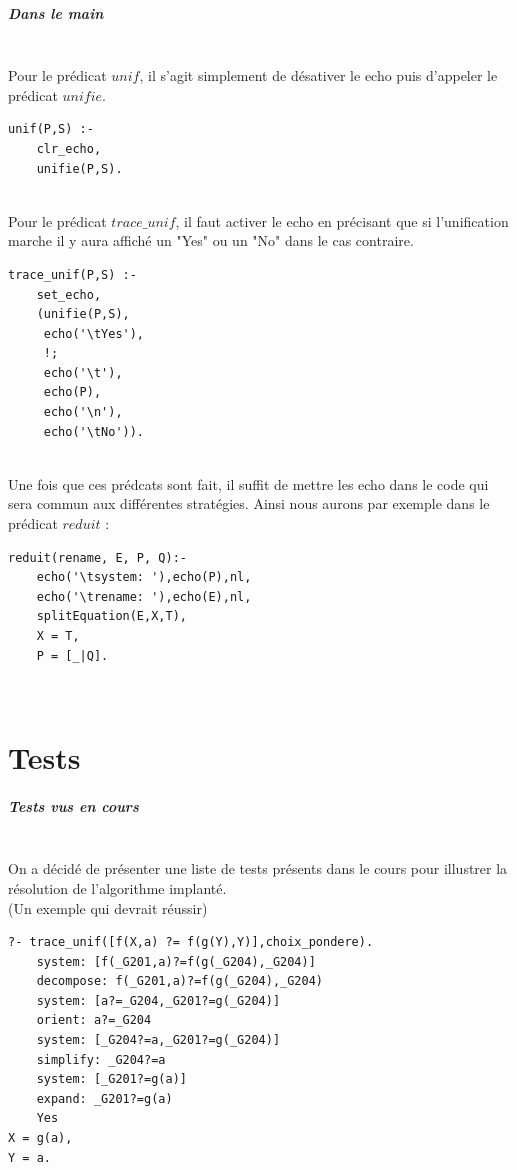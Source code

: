 \documentclass[10pt,a4paper]{report}
\begin{document}
\paragraph{Dans le main} ~\\
Pour le prédicat $unif$, il s'agit simplement de désativer le echo puis d'appeler le prédicat $unifie$.
\begin{lstlisting}[caption ={unif dans $main.pl$}]
unif(P,S) :-
	clr_echo,
	unifie(P,S).
\end{lstlisting} ~\\
Pour le prédicat $trace\_unif$, il faut activer le echo en précisant que si l'unification marche il y aura affiché un "Yes" ou un "No" dans le cas contraire.
\begin{lstlisting}[caption ={trace\_unif dans $main.pl$}]
trace_unif(P,S) :-
	set_echo,
	(unifie(P,S),
	 echo('\tYes'),
	 !;
	 echo('\t'),
	 echo(P),
	 echo('\n'),
	 echo('\tNo')).
\end{lstlisting} ~\\
Une fois que ces prédcats sont fait, il suffit de mettre les echo dans le code qui sera commun aux différentes stratégies. Ainsi nous aurons par exemple dans le prédicat $reduit$ :
\begin{lstlisting}[caption ={Les echos dans $main.pl$}]
reduit(rename, E, P, Q):-
	echo('\tsystem: '),echo(P),nl,
	echo('\trename: '),echo(E),nl,
	splitEquation(E,X,T),
	X = T,
	P = [_|Q].
\end{lstlisting} ~\\




\mbox{}
\newpage
\chapter*{Tests}
\paragraph{Tests vus en cours} ~\\
On a décidé de présenter une liste de tests présents dans le cours pour illustrer la résolution de l'algorithme implanté.\\
(Un exemple qui devrait réussir)
\begin{lstlisting}[caption ={Des tests de cours}]
?- trace_unif([f(X,a) ?= f(g(Y),Y)],choix_pondere).
	system: [f(_G201,a)?=f(g(_G204),_G204)]
	decompose: f(_G201,a)?=f(g(_G204),_G204)
	system: [a?=_G204,_G201?=g(_G204)]
	orient: a?=_G204
	system: [_G204?=a,_G201?=g(_G204)]
	simplify: _G204?=a
	system: [_G201?=g(a)]
	expand: _G201?=g(a)
	Yes
X = g(a),
Y = a.
\end{lstlisting} ~\\
\end{document}
